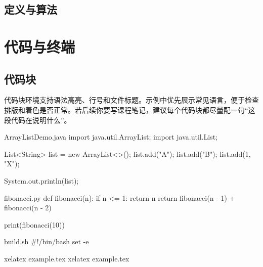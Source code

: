 \documentclass{computer-notes}
\begin{document}

\section{定义与算法}



\chapter{代码与终端}

\section{代码块}
代码块环境支持语法高亮、行号和文件标题。示例中优先展示常见语言，便于检查排版和着色是否正常。若后续你要写课程笔记，建议每个代码块都尽量配一句“这段代码在说明什么”。

\begin{codeblock}[Java]{ArrayListDemo.java}
import java.util.ArrayList;
import java.util.List;

List<String> list = new ArrayList<>();
list.add("A");
list.add("B");
list.add(1, "X");

System.out.println(list);
\end{codeblock}

\begin{codeblock}[Python]{fibonacci.py}
def fibonacci(n):
    if n <= 1:
        return n
    return fibonacci(n - 1) + fibonacci(n - 2)

print(fibonacci(10))
\end{codeblock}

\begin{codeblock}[Bash]{build.sh}
#!/bin/bash
set -e

xelatex example.tex
xelatex example.tex
\end{codeblock}
\end{document}
